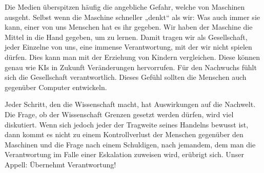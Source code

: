 Die Medien überspitzen häufig die angebliche Gefahr, welche von Maschinen ausgeht. Selbst wenn die Maschine schneller „denkt“ als wir: Was auch immer sie kann, einer von uns Menschen hat es ihr gegeben. Wir haben der Maschine die Mittel in die Hand gegeben, um zu lernen. Damit tragen wir als Gesellschaft, jeder Einzelne von uns, eine immense Verantwortung, mit der wir nicht spielen dürfen. Dies kann man mit der Erziehung von Kindern vergleichen. Diese können genau wie KIs in Zukunft Veränderungen hervorrufen. Für den Nachwuchs fühlt sich die Gesellschaft verantwortlich. Dieses Gefühl  sollten die Menschen auch gegenüber Computer entwickeln. 

Jeder Schritt, den die Wissenschaft macht, hat Auswirkungen auf die Nachwelt. Die Frage, ob der Wissenschaft Grenzen gesetzt werden dürfen, wird viel diskutiert. Wenn sich jedoch jeder der Tragweite seines Handelns bewusst ist, dann kommt es nicht zu einem Kontrollverlust der Menschen gegenüber den Maschinen und die Frage nach einem Schuldigen, nach jemandem, dem man die Verantwortung im Falle einer Eskalation zuweisen wird, erübrigt sich. Unser Appell: Übernehmt Verantwortung!




